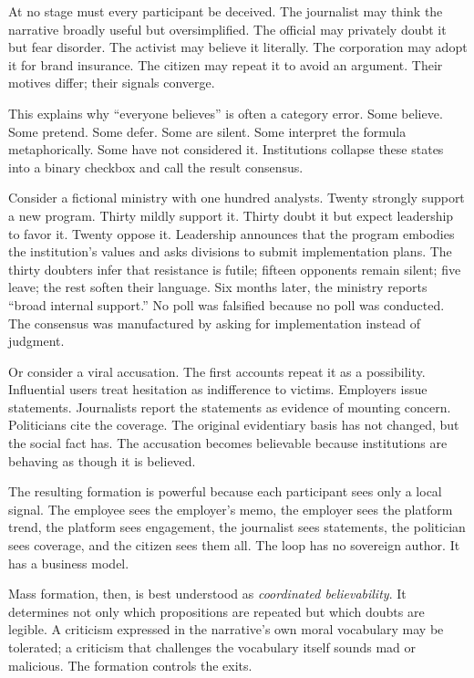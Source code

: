 ﻿\documentclass[12pt,a4paper]{book}
\begin{document}
At no stage must every participant be deceived. The journalist may think the narrative broadly useful but oversimplified. The official may privately doubt it but fear disorder. The activist may believe it literally. The corporation may adopt it for brand insurance. The citizen may repeat it to avoid an argument. Their motives differ; their signals converge.

This explains why “everyone believes” is often a category error. Some believe. Some pretend. Some defer. Some are silent. Some interpret the formula metaphorically. Some have not considered it. Institutions collapse these states into a binary checkbox and call the result consensus.

Consider a fictional ministry with one hundred analysts. Twenty strongly support a new program. Thirty mildly support it. Thirty doubt it but expect leadership to favor it. Twenty oppose it. Leadership announces that the program embodies the institution's values and asks divisions to submit implementation plans. The thirty doubters infer that resistance is futile; fifteen opponents remain silent; five leave; the rest soften their language. Six months later, the ministry reports “broad internal support.” No poll was falsified because no poll was conducted. The consensus was manufactured by asking for implementation instead of judgment.

Or consider a viral accusation. The first accounts repeat it as a possibility. Influential users treat hesitation as indifference to victims. Employers issue statements. Journalists report the statements as evidence of mounting concern. Politicians cite the coverage. The original evidentiary basis has not changed, but the social fact has. The accusation becomes believable because institutions are behaving as though it is believed.

The resulting formation is powerful because each participant sees only a local signal. The employee sees the employer's memo, the employer sees the platform trend, the platform sees engagement, the journalist sees statements, the politician sees coverage, and the citizen sees them all. The loop has no sovereign author. It has a business model.

Mass formation, then, is best understood as \emph{coordinated believability}. It determines not only which propositions are repeated but which doubts are legible. A criticism expressed in the narrative's own moral vocabulary may be tolerated; a criticism that challenges the vocabulary itself sounds mad or malicious. The formation controls the exits.
\end{document}
